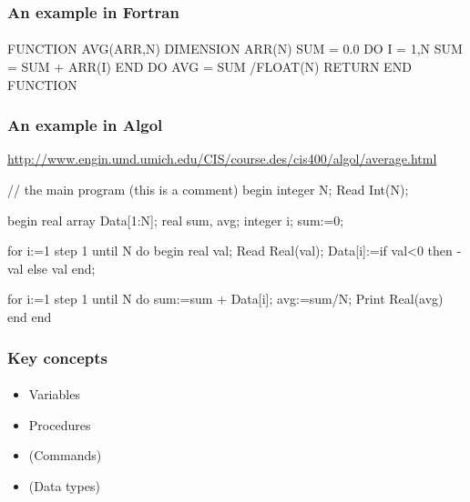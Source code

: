 \documentclass{beamer}
\begin{document}
\begin{frame}[fragile]
\frametitle{An example in Fortran}
\framesubtitle{}

\begin{cplus3}
    FUNCTION AVG(ARR,N)
    DIMENSION ARR(N)
    SUM = 0.0
    DO I = 1,N
       SUM = SUM + ARR(I)
    END DO
    AVG = SUM /FLOAT(N)
    RETURN 
    END FUNCTION
\end{cplus3}
\end{frame}


\begin{frame}[fragile]
\frametitle{An example in Algol}
\url{http://www.engin.umd.umich.edu/CIS/course.des/cis400/algol/average.html}
\begin{cplus3}
// the main program (this is a comment)
begin
  integer N;
  Read Int(N);

  begin
    real array Data[1:N];
    real sum, avg;
    integer i;
    sum:=0;

    for i:=1 step 1 until N do
      begin real val;
        Read Real(val);
        Data[i]:=if val<0 then -val else val
      end;

    for i:=1 step 1 until N do
      sum:=sum + Data[i];
    avg:=sum/N;
    Print Real(avg)
  end
end	
\end{cplus3}
\end{frame}



\begin{frame}[fragile]
\frametitle{Key concepts}
\framesubtitle{}
\begin{itemize}
\item Variables
\item Procedures
\item (Commands)
\item (Data types)
\end{itemize}
\end{frame}
\end{document}

